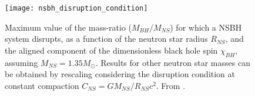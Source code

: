     \begin{figure}[H]
        \centering
        \texttt{[image: nsbh\_disruption\_condition]}
        \caption[Disruption condition in a NSBH binary]{
                    Maximum value of the mass-ratio ($M_{BH}/M_{NS}$) for which a NSBH system
                    disrupts, as a function of the neutron star radius $R_{NS}$, and the aligned
                    component of the dimensionless black hole spin $\chi_{BH}$, assuming $M_{NS} =
                    1.35 M_{\odot}$. Results for other neutron star masses can be obtained by
                    rescaling considering the disruption condition at constant compaction $C_{NS} =
                    GM_{NS}/R_{NS} c^2$. From \cite{foucart_2020}.
            }
        \label{fig:nsbh_disruption_condition}
    \end{figure}

